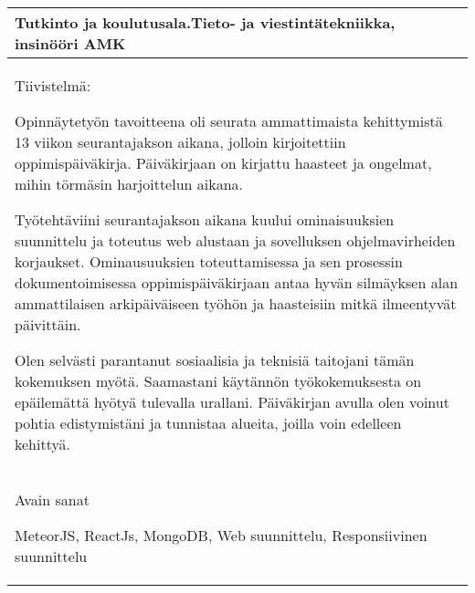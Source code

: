 \begin{tabular}{ | l | }
    \begin{minipage}[t][1.5cm][t]{10cm}
    Tutkinto ja koulutusala.\newline  Tieto- ja viestintätekniikka, insinööri AMK  

    \end{minipage}\\ \hline

    \begin{minipage}[t][7.5cm][t]{14.5cm}
    Tiivistelmä: \medskip 
    
    Opinnäytetyön tavoitteena oli seurata ammattimaista kehittymistä 13 viikon seurantajakson aikana, 
        jolloin kirjoitettiin oppimispäiväkirja. Päiväkirjaan on kirjattu haasteet ja ongelmat, mihin törmäsin harjoittelun aikana. \medskip

    Työtehtäviini seurantajakson aikana kuului 
        ominaisuuksien suunnittelu ja toteutus web alustaan ja sovelluksen ohjelmavirheiden korjaukset.
        Ominausuuksien toteuttamisessa ja sen prosessin dokumentoimisessa oppimispäiväkirjaan antaa hyvän silmäyksen alan ammattilaisen arkipäiväiseen työhön 
        ja haasteisiin mitkä ilmeentyvät päivittäin. \medskip

    Olen selvästi parantanut sosiaalisia ja teknisiä taitojani tämän kokemuksen myötä.
        Saamastani käytännön työkokemuksesta on epäilemättä hyötyä tulevalla urallani.
        Päiväkirjan avulla olen voinut pohtia edistymistäni ja tunnistaa alueita, joilla voin edelleen kehittyä. 

    \end{minipage}\\ \hline

    \begin{minipage}[t][2cm][t]{14cm}
    Avain sanat \medskip

    MeteorJS, ReactJs, MongoDB, Web suunnittelu, Responsiivinen suunnittelu
    \end{minipage}\\ \hline

\end{tabular}


\newpage



